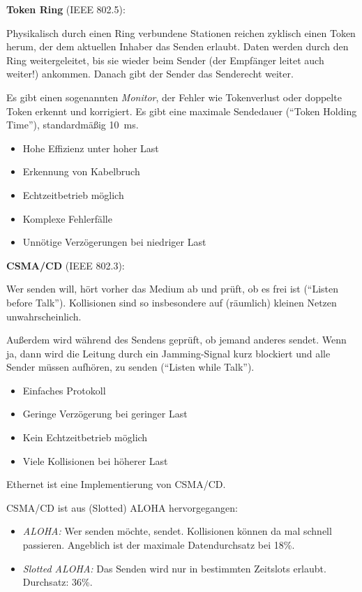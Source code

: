 \documentclass[a4paper,parskip=half*,DIV=15,fontsize=11pt]{scrartcl}
\newcommand\pro{\item[$+$]}
\newcommand\con{\item[$-$]}
\begin{document}
\begin{minipage}[t]{0.45\textwidth}
\textbf{Token Ring} (IEEE 802.5):

Physikalisch durch einen Ring verbundene Stationen reichen zyklisch einen Token herum, der dem aktuellen Inhaber das Senden erlaubt. Daten werden durch den Ring weitergeleitet, bis sie wieder beim Sender (der Empfänger leitet auch weiter!) ankommen. Danach gibt der Sender das Senderecht weiter.

Es gibt einen sogenannten \emph{Monitor}, der Fehler wie Tokenverlust oder doppelte Token erkennt und korrigiert. Es gibt eine maximale Sendedauer (``Token Holding Time''), standardmäßig \SI{10}{\ms}.

\begin{itemize}
    \itemsep0em
    \pro Hohe Effizienz unter hoher Last
    \pro Erkennung von Kabelbruch
    \pro Echtzeitbetrieb möglich
    \con Komplexe Fehlerfälle
    \con Unnötige Verzögerungen bei niedriger Last
\end{itemize}
\end{minipage}\hspace{0.05\textwidth}
\begin{minipage}[t]{0.45\textwidth}
\textbf{CSMA/CD} (IEEE 802.3):

Wer senden will, hört vorher das Medium ab und prüft, ob es frei ist (``Listen before Talk''). Kollisionen sind so insbesondere auf (räumlich) kleinen Netzen unwahrscheinlich.

Außerdem wird während des Sendens geprüft, ob jemand anderes sendet. Wenn ja, dann wird die Leitung durch ein Jamming-Signal kurz blockiert und alle Sender müssen aufhören, zu senden (``Listen while Talk'').

\begin{itemize}
    \itemsep0em
    \pro Einfaches Protokoll
    \pro Geringe Verzögerung bei geringer Last
    \con Kein Echtzeitbetrieb möglich
    \con Viele Kollisionen bei höherer Last
\end{itemize}

Ethernet ist eine Implementierung von CSMA/CD.
\end{minipage}

\medskip

CSMA/CD ist aus (Slotted) ALOHA hervorgegangen:
\begin{itemize}
\item \emph{ALOHA:} Wer senden möchte, sendet. Kollisionen können da mal schnell passieren. Angeblich ist der maximale Datendurchsatz bei 18\%.
\item \emph{Slotted ALOHA:} Das Senden wird nur in bestimmten Zeitslots erlaubt. Durchsatz: 36\%.
\end{itemize}
\end{document}
